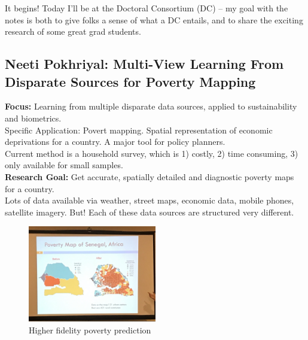 It begins! Today I'll be at the Doctoral Consortium (DC) -- my goal with the notes is both to give folks a sense of what a DC entails, and to share the exciting research of some great grad students. \\

\subsection{Neeti Pokhriyal: Multi-View Learning From Disparate Sources for Poverty Mapping}

{\bf Focus:} Learning from multiple disparate data sources, applied to sustainability and biometrics. \\

Specific Application: Povert mapping. Spatial representation of economic deprivations for a country. A major tool for policy planners. \\

Current method is a household survey, which is 1) costly, 2) time consuming, 3) only available for small samples. \\

{\bf Research Goal:} Get accurate, spatially detailed and diagnostic poverty maps for a country. \\

Lots of data available via weather, street maps, economic data, mobile phones, satellite imagery. But! Each of these data sources are structured very different. \\

\begin{figure}[h!]
    \centering
    \includegraphics[width=0.5\textwidth]{images/pov_map.JPG}
    \caption{Higher fidelity poverty prediction}
    \label{fig:pov_map}
\end{figure}


